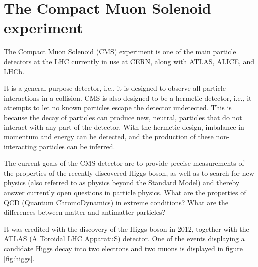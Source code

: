 \chapter{The Compact Muon Solenoid experiment}
\label{The Compact Muon Solenoid experiment}
The Compact Muon Solenoid (CMS) experiment is one of the main particle detectors
at the LHC currently in use at CERN, along with ATLAS, ALICE, and LHCb.

It is a general purpose detector, i.e., it is designed to observe all particle
interactions in a collision.
CMS is also designed to be a hermetic detector, i.e., it attempts to let no known particles
escape the detector undetected.
This is because the decay of particles can produce new, neutral, particles that do not interact with
any part of the detector.
With the hermetic design, imbalance in momentum and energy can be detected, and
the production of these non-interacting particles can be inferred.

The current goals of the CMS detector are to provide precise measurements of the
properties of the recently discovered Higgs boson, as well as to search for new
physics (also referred to as physics beyond the Standard Model) and thereby
answer currently open questions in particle physics. What are the properties of
QCD (Quantum ChromoDynamics) in extreme conditions? What are the differences
between matter and antimatter particles?


It was credited with the discovery of the Higgs boson in 2012, together with the
ATLAS (A Toroidal LHC ApparatuS) detector.
One of the events displaying a candidate Higgs decay into two electrons and two
muons is displayed in figure \ref{fig:higgs}.


